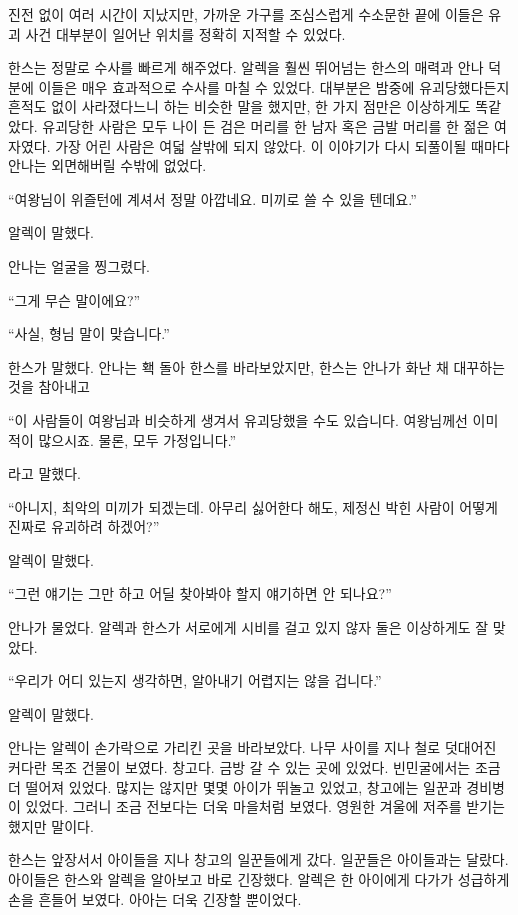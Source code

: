 진전 없이 여러 시간이 지났지만, 가까운 가구를 조심스럽게 수소문한 끝에 이들은 유괴 사건 대부분이 일어난 위치를 정확히 지적할 수 있었다.

한스는 정말로 수사를 빠르게 해주었다. 알렉을 훨씬 뛰어넘는 한스의 매력과 안나 덕분에 이들은 매우 효과적으로 수사를 마칠 수 있었다. 대부분은 밤중에 유괴당했다든지 흔적도 없이 사라졌다느니 하는 비슷한 말을 했지만, 한 가지 점만은 이상하게도 똑같았다. 유괴당한 사람은 모두 나이 든 검은 머리를 한 남자 혹은 금발 머리를 한 젊은 여자였다. 가장 어린 사람은 여덟 살밖에 되지 않았다. 이 이야기가 다시 되풀이될 때마다 안나는 외면해버릴 수밖에 없었다.

``여왕님이 위즐턴에 계셔서 정말 아깝네요. 미끼로 쓸 수 있을 텐데요.''

알렉이 말했다.

안나는 얼굴을 찡그렸다.

``그게 무슨 말이에요?''

``사실, 형님 말이 맞습니다.''

한스가 말했다. 안나는 홱 돌아 한스를 바라보았지만, 한스는 안나가 화난 채 대꾸하는 것을 참아내고

``이 사람들이 여왕님과 비슷하게 생겨서 유괴당했을 수도 있습니다. 여왕님께선 이미 적이 많으시죠. 물론, 모두 가정입니다.''

라고 말했다.

``아니지, 최악의 미끼가 되겠는데. 아무리 싫어한다 해도, 제정신 박힌 사람이 어떻게 진짜로 유괴하려 하겠어?''

알렉이 말했다.

``그런 얘기는 그만 하고 어딜 찾아봐야 할지 얘기하면 안 되나요?''

안나가 물었다. 알렉과 한스가 서로에게 시비를 걸고 있지 않자 둘은 이상하게도 잘 맞았다.

``우리가 어디 있는지 생각하면, 알아내기 어렵지는 않을 겁니다.''

알렉이 말했다.

안나는 알렉이 손가락으로 가리킨 곳을 바라보았다. 나무 사이를 지나 철로 덧대어진 커다란 목조 건물이 보였다. 창고다. 금방 갈 수 있는 곳에 있었다. 빈민굴에서는 조금 더 떨어져 있었다. 많지는 않지만 몇몇 아이가 뛰놀고 있었고, 창고에는 일꾼과 경비병이 있었다. 그러니 조금 전보다는 더욱 마을처럼 보였다. 영원한 겨울에 저주를 받기는 했지만 말이다.

한스는 앞장서서 아이들을 지나 창고의 일꾼들에게 갔다. 일꾼들은 아이들과는 달랐다. 아이들은 한스와 알렉을 알아보고 바로 긴장했다. 알렉은 한 아이에게 다가가 성급하게 손을 흔들어 보였다. 아아는 더욱 긴장할 뿐이었다.


